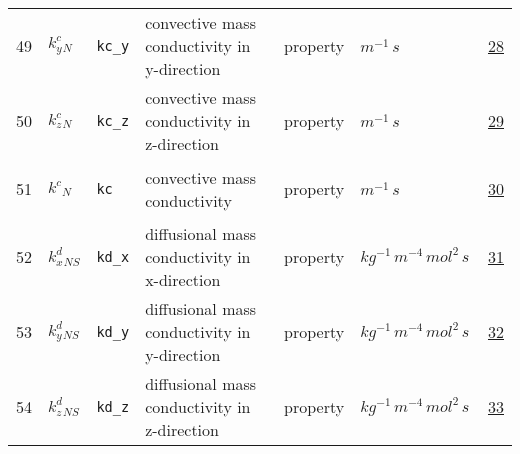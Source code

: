 \begin{longtable}{|p{1cm}|p{2.5cm}|p{4.5cm}|p{8cm}|p{3.0cm}|p{3cm}|p{1cm}|}
            49
             & \hypertarget{"v:49"}{ $ {{k^c_y}}{_{N}} $}
             & \verb|kc_y|
             & convective mass conductivity in y-direction
             & \begin{lay}property \end{lay}
             & $ m^{-1} \,s \, $
             &                 \hyperlink{"e:28"}{ 28 }
                 \\
            50
             & \hypertarget{"v:50"}{ $ {{k^c_z}}{_{N}} $}
             & \verb|kc_z|
             & convective mass conductivity in z-direction
             & \begin{lay}property \end{lay}
             & $ m^{-1} \,s \, $
             &                 \hyperlink{"e:29"}{ 29 }
                 \\
            51
             & \hypertarget{"v:51"}{ $ {{k^c}}{_{N}} $}
             & \verb|kc|
             & convective mass conductivity
             & \begin{lay}property \end{lay}
             & $ m^{-1} \,s \, $
             &                 \hyperlink{"e:30"}{ 30 }
                 \\
            52
             & \hypertarget{"v:52"}{ $ {{k^d_x}}{_{{N S}}} $}
             & \verb|kd_x|
             & diffusional mass conductivity in x-direction
             & \begin{lay}property \end{lay}
             & $ kg^{-1} \,m^{-4} \,mol^{2} \,s \, $
             &                 \hyperlink{"e:31"}{ 31 }
                 \\
            53
             & \hypertarget{"v:53"}{ $ {{k^d_y}}{_{{N S}}} $}
             & \verb|kd_y|
             & diffusional mass conductivity in y-direction
             & \begin{lay}property \end{lay}
             & $ kg^{-1} \,m^{-4} \,mol^{2} \,s \, $
             &                 \hyperlink{"e:32"}{ 32 }
                 \\
            54
             & \hypertarget{"v:54"}{ $ {{k^d_z}}{_{{N S}}} $}
             & \verb|kd_z|
             & diffusional mass conductivity in z-direction
             & \begin{lay}property \end{lay}
             & $ kg^{-1} \,m^{-4} \,mol^{2} \,s \, $
             &                 \hyperlink{"e:33"}{ 33 }
                 \\

\end{longtable}
